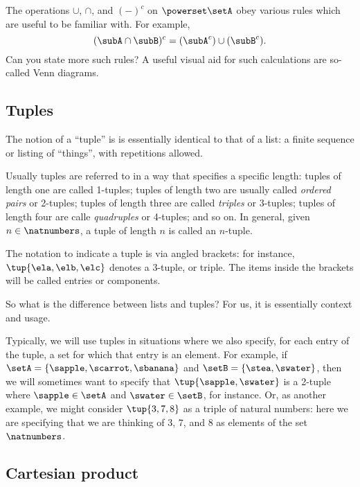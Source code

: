 The operations $\cup$, $\cap$, and $( - )^c$ on $\powerset \setA$ obey various rules which are useful to be familiar with. For example, 
\begin{equation}
(\subA \cap \subB)^c = (\subA^c) \cup (\subB^c).
\end{equation}
Can you state more such rules? 
A useful visual aid for such calculations are so-called Venn diagrams. 



\subsection{Tuples}

The notion of a ``tuple'' is is essentially identical to that of a list: a finite sequence or listing of ``things'', with repetitions allowed. 

Usually tuples are referred to in a way that specifies a specific length: tuples of length one are called 1-tuples; tuples of length two are usually called \emph{ordered pairs} or 2-tuples; tuples of length three are called \emph{triples} or $3$-tuples; tuples of length four are calle \emph{quadruples} or 4-tuples; and so on. In general, given $n \in \natnumbers$, a tuple of length $n$ is called an $n$-tuple. 

The notation to indicate a tuple is via angled brackets: for instance, $\tup{\ela, \elb, \elc}$ denotes a 3-tuple, or triple. The items inside the brackets will be called entries or components. 

So what is the difference between lists and tuples? For us, it is essentially context and usage. 

Typically, we will use tuples in situations where we also specify, for each entry of the tuple, a set for which that entry is an element. For example, if $\setA = \{ \sapple, \scarrot, \sbanana \}$ and $\setB = \{ \stea, \swater \}$, then we will sometimes want to specify that $\tup{\sapple, \swater}$ is a 2-tuple where $\sapple \in \setA$ and $\swater \in \setB$, for instance. Or, as another example, we might consider $\tup{3, 7, 8}$ as a triple of natural numbers: here we are specifying that we are thinking of $3$, $7$, and $8$ as elements of the set $\natnumbers$. 

\subsection{Cartesian product}\label{sec:cartesian-product}

